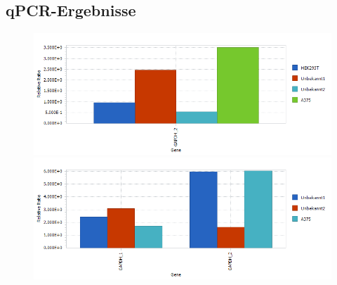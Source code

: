 \documentclass{article}
\begin{document}
\subsection*{qPCR-Ergebnisse}
\begin{figure}[ht]
    \centering
    \begin{minipage}[b]{0.45\textwidth}
        \centering
        \includegraphics[width=\textwidth]{images/cycler/G1_2_G2.png}
    \end{minipage}
    \begin{minipage}[b]{0.45\textwidth}
        \centering
        \includegraphics[width=\textwidth]{images/cycler/g1_and_g2.png}
    \end{minipage}
    
    \vspace{0.5cm}
    

\end{figure}
\end{document}
